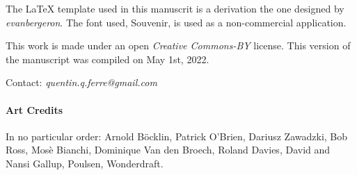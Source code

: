 The LaTeX template used in this manuscrit is a derivation the one designed by \textit{evanbergeron}. The font used, Souvenir, is used as a non-commercial application.

\vskip 0.5cm

This work is made under an open \textit{Creative Commons-BY} license. This version of the manuscript was compiled on May 1st, 2022.



Contact: \textit{quentin.q.ferre@gmail.com}




\paragraph{Art Credits}

In no particular order: Arnold Böcklin, Patrick O'Brien, Dariusz Zawadzki, Bob Ross, Mosè Bianchi, Dominique Van den Broech, Roland Davies, David and Nansi Gallup, Poulsen, Wonderdraft.


